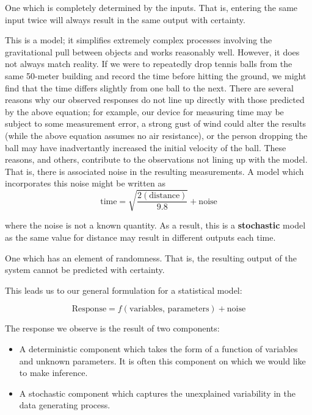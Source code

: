 \documentclass[]{book}
\providecommand{\tightlist}{%
  \setlength{\itemsep}{0pt}\setlength{\parskip}{0pt}}
\theoremstyle{definition}
\theoremstyle{definition}
\theoremstyle{remark}
\let\BeginKnitrBlock\begin \let\EndKnitrBlock\end
\begin{document}
\BeginKnitrBlock{definition}[Deterministic Process]
\protect\hypertarget{def:defn-deterministic-process}{}{\label{def:defn-deterministic-process}
{} }One which is completely
determined by the inputs. That is, entering the same input twice will
always result in the same output with certainty.
\EndKnitrBlock{definition}

This is a model; it simplifies extremely complex processes involving the
gravitational pull between objects and works reasonably well. However,
it does not always match reality. If we were to repeatedly drop tennis
balls from the same 50-meter building and record the time before hitting
the ground, we might find that the time differs slightly from one ball
to the next. There are several reasons why our observed responses do not
line up directly with those predicted by the above equation; for
example, our device for measuring time may be subject to some
measurement error, a strong gust of wind could alter the results (while
the above equation assumes no air resistance), or the person dropping
the ball may have inadvertantly increased the initial velocity of the
ball. These reasons, and others, contribute to the observations not
lining up with the model. That is, there is associated noise in the
resulting measurements. A model which incorporates this noise might be
written as
\[\text{time} = \sqrt{\frac{2(\text{distance})}{9.8}} + \text{noise}\]

where the noise is not a known quantity. As a result, this is a
\textbf{stochastic} model as the same value for distance may result in
different outputs each time.

\BeginKnitrBlock{definition}[Stochastic Process]
\protect\hypertarget{def:defn-stochastic-process}{}{\label{def:defn-stochastic-process}
{} }One which has an element of
randomness. That is, the resulting output of the system cannot be
predicted with certainty.
\EndKnitrBlock{definition}

This leads us to our general formulation for a statistical model:

\begin{equation}
  \text{Response} = f(\text{variables, parameters}) + \text{noise}
  \label{eq:general-model}
\end{equation}

The response we observe is the result of two components:

\begin{itemize}
\tightlist
\item
  A deterministic component which takes the form of a function of
  variables and unknown parameters. It is often this component on which
  we would like to make inference.
\item
  A stochastic component which captures the unexplained variability in
  the data generating process.
\end{itemize}
\end{document}
